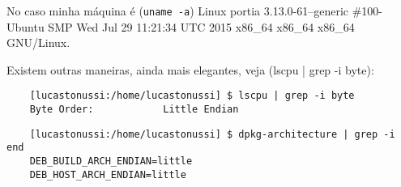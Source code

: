 \documentclass{article}
\begin{document}
No caso minha máquina é (\verb|uname -a|) Linux portia 3.13.0-61--generic 
\#100-Ubuntu SMP Wed Jul 29 11:21:34 UTC 2015 x86\_64 x86\_64 x86\_64 GNU/Linux.

Existem outras maneiras, ainda mais elegantes, veja (lscpu | grep -i byte):

  \begin{verbatim}
    [lucastonussi:/home/lucastonussi] $ lscpu | grep -i byte
    Byte Order:            Little Endian
  \end{verbatim}

  \begin{verbatim}
    [lucastonussi:/home/lucastonussi] $ dpkg-architecture | grep -i end
    DEB_BUILD_ARCH_ENDIAN=little
    DEB_HOST_ARCH_ENDIAN=little
  \end{verbatim}
\end{document}
